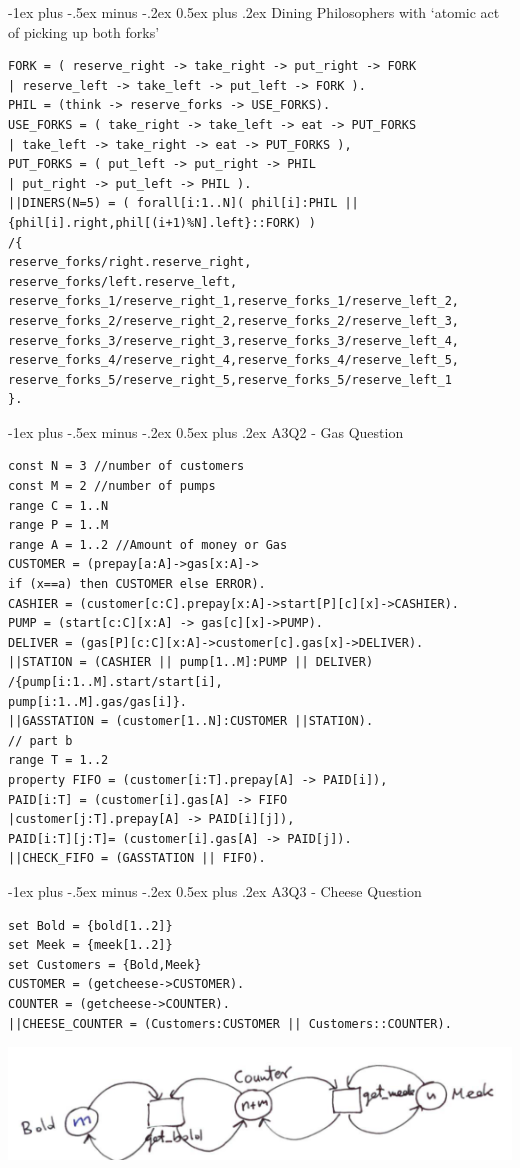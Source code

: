\documentclass[letterpaper, 8pt]{extarticle}
\makeatletter
\renewcommand{\section}{\@startsection{section}{1}{0mm}%
                                {-1ex plus -.5ex minus -.2ex}%
                                {0.5ex plus .2ex}%
                                {\normalfont\normalsize\bfseries}}
\makeatother
\begin{document}
\begin{multicols*}{5}
  \section{Dining Philosophers with ‘atomic act of picking up both forks’}
  \begin{lstlisting}
FORK = ( reserve_right -> take_right -> put_right -> FORK
| reserve_left -> take_left -> put_left -> FORK ).
PHIL = (think -> reserve_forks -> USE_FORKS).
USE_FORKS = ( take_right -> take_left -> eat -> PUT_FORKS
| take_left -> take_right -> eat -> PUT_FORKS ),
PUT_FORKS = ( put_left -> put_right -> PHIL
| put_right -> put_left -> PHIL ).
||DINERS(N=5) = ( forall[i:1..N]( phil[i]:PHIL || {phil[i].right,phil[(i+1)%N].left}::FORK) )
/{
reserve_forks/right.reserve_right,
reserve_forks/left.reserve_left,
reserve_forks_1/reserve_right_1,reserve_forks_1/reserve_left_2,
reserve_forks_2/reserve_right_2,reserve_forks_2/reserve_left_3,
reserve_forks_3/reserve_right_3,reserve_forks_3/reserve_left_4,
reserve_forks_4/reserve_right_4,reserve_forks_4/reserve_left_5,
reserve_forks_5/reserve_right_5,reserve_forks_5/reserve_left_1
}.
\end{lstlisting}

  \section{A3Q2 - Gas Question}
  \begin{lstlisting}
const N = 3 //number of customers
const M = 2 //number of pumps
range C = 1..N
range P = 1..M
range A = 1..2 //Amount of money or Gas
CUSTOMER = (prepay[a:A]->gas[x:A]->
if (x==a) then CUSTOMER else ERROR).
CASHIER = (customer[c:C].prepay[x:A]->start[P][c][x]->CASHIER).
PUMP = (start[c:C][x:A] -> gas[c][x]->PUMP).
DELIVER = (gas[P][c:C][x:A]->customer[c].gas[x]->DELIVER).
||STATION = (CASHIER || pump[1..M]:PUMP || DELIVER)
/{pump[i:1..M].start/start[i],
pump[i:1..M].gas/gas[i]}.
||GASSTATION = (customer[1..N]:CUSTOMER ||STATION).
// part b
range T = 1..2
property FIFO = (customer[i:T].prepay[A] -> PAID[i]),
PAID[i:T] = (customer[i].gas[A] -> FIFO
|customer[j:T].prepay[A] -> PAID[i][j]),
PAID[i:T][j:T]= (customer[i].gas[A] -> PAID[j]).
||CHECK_FIFO = (GASSTATION || FIFO).
\end{lstlisting}

  \section{A3Q3 - Cheese Question}
  \begin{lstlisting}
set Bold = {bold[1..2]}
set Meek = {meek[1..2]}
set Customers = {Bold,Meek}
CUSTOMER = (getcheese->CUSTOMER).
COUNTER = (getcheese->COUNTER).
||CHEESE_COUNTER = (Customers:CUSTOMER || Customers::COUNTER).
\end{lstlisting}
  \includegraphics[width = \linewidth]{a3q3.png}


\end{multicols*}
\end{document}
